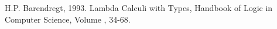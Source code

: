 \begin{thebibliography}{9}
H.P. Barendregt, 1993. Lambda Calculi with Types, Handbook of Logic in Computer Science, Volume , 34-68.
\end{thebibliography}